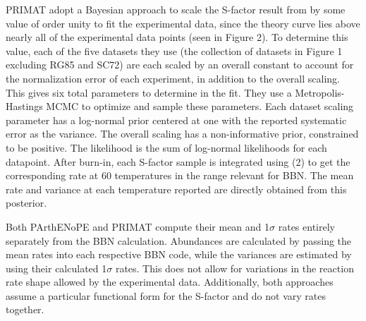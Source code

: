 \documentclass[%
 reprint,
superscriptaddress,
nofootinbib,
 amsmath,amssymb,
 aps,
 pra,
]{revtex4-2}
\begin{document}
PRIMAT adopt a Bayesian approach to scale the S-factor result from \cite{Arai2011} by some value of order unity to fit the experimental data, since the theory curve lies above nearly all of the experimental data points (seen in Figure 2). To determine this value, each of the five datasets they use (the collection of datasets in Figure 1 excluding RG85 and SC72) are each scaled by an overall constant to account for the normalization error of each experiment, in addition to the overall scaling. This gives six total parameters to determine in the fit. They use a Metropolis-Hastings MCMC to optimize and sample these parameters. Each dataset scaling parameter has a log-normal prior centered at one with the reported systematic error as the variance. The overall scaling has a non-informative prior, constrained to be positive. The likelihood is the sum of log-normal likelihoods for each datapoint. After burn-in, each S-factor sample is integrated using (2) to get the corresponding rate at 60 temperatures in the range relevant for BBN. The mean rate and variance at each temperature reported are directly obtained from this posterior. 

Both PArthENoPE and PRIMAT compute their mean and 1$\sigma$ rates entirely separately from the BBN calculation. Abundances are calculated by passing the mean rates into each respective BBN code, while the variances are estimated by using their calculated 1$\sigma$ rates. This does not allow for variations in the reaction rate shape allowed by the experimental data. Additionally, both approaches assume a particular functional form for the S-factor and do not vary rates together. 


\end{document}

